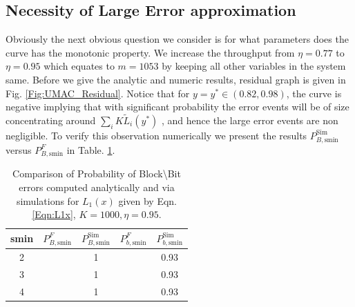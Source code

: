 
\subsection{Necessity of Large Error approximation}
Obviously the next obvious question we consider is for what parameters does the curve has the monotonic property. We increase the throughput from $\eta=0.77$ to $\eta=0.95$ which equates to $m=1053$ by keeping all other variables in the system same. Before we give the analytic and numeric results, residual graph is given in Fig. \ref{Fig:UMAC_Residual}. Notice that for $y=y^*\in(0.82,0.98)$, the curve is negative implying that with significant probability the error events will be of size concentrating around $\sum_{i}K\tilde{L}_{i}(y^*)$ , and hence the large error events are non negligible. To verify this observation numerically we present the results  $P_{B,\text{smin}}^{\text{Sim}}$ versus $P_{B,\text{smin}}^F$ in Table. \ref{Table:SimvsAnalytic3}.
%

\begin{table}
\centering
\begin{tabular}{c c c c c}
\hline  \hline
smin & $P_{B,\text{smin}}^F$ & $P_{B,\text{smin}}^{\text{Sim}}$& $P_{b,\text{smin}}^{F}$ &$P_{b,\text{smin}}^{\text{Sim}}$\\
\hline
2 &   &1 & &0.93\\
3 &  &1 & &0.93\\
4 &  &1 & &0.93\\
\end{tabular}
\caption{Comparison of Probability of Block\textbackslash Bit errors computed analytically and via simulations for $L_1(x)$ given by Eqn. \eqref{Eqn:L1x}, $K=1000, \eta=0.95$.}
\label{Table:SimvsAnalytic3}
\end{table}